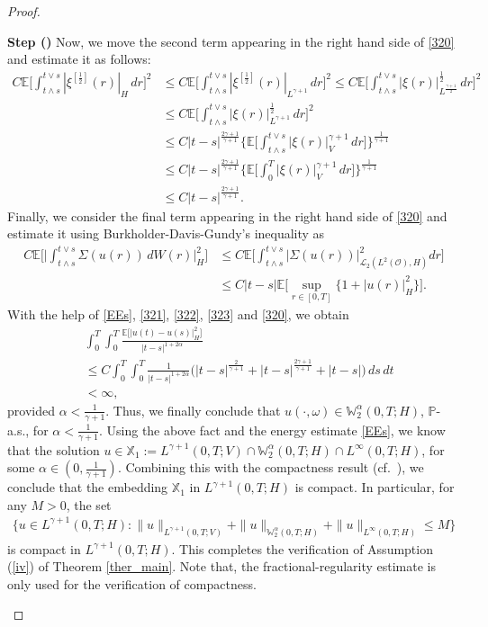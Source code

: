 \documentclass[english,a4paper,11pt]{amsart}
\theoremstyle{plain}
\theoremstyle{definition}
\theoremstyle{remark}
\numberwithin{equation}{section}
\newcounter{lil1}
\newenvironment{step}
{\begin{list} { \bf Step (\Roman{lil1})}
		{ \usecounter{lil1}
			\setlength{\leftmargin}{0.0cm}
			\setlength{\topsep}{0.2cm}
			\setlength{\itemsep}{0.0cm}
			\setlength{\parsep}{0.1cm}
			\setlength{\itemindent}{0.8cm}
			\setlength{\parskip}{0.0cm}}}
	{\end{list}}
\newcounter{lil33}
\newcounter{lil1q}
\newcommand{\PP}{{\mathbb{P}}}
\newcommand{\EE}{ \mathbb{E} }
\newcommand{\X}{\mathbb{X}}
\begin{document}
\begin{proof}
\begin{step}
{Now, we move the second term appearing in the right hand side of \eqref{320} and estimate it as follows: 
\begin{align}\label{322}\nonumber
	C\EE\bigg[\int_{t\wedge s}^{t\vee s} |\xi^{[\frac{1}{2}]}(r)|_H\, d r\bigg]^2& \leq C \EE\bigg[\int_{t\wedge s}^{t\vee s} |\xi^{[\frac{1}{2}]}(r)|_{L^{\gamma+1}}\,  dr\bigg]^2  
	\leq C \EE\bigg[\int_{t\wedge s}^{t\vee s} |\xi(r)|_{L^{\frac{\gamma+1}{2}}}^\frac{1}{2} \, dr\bigg]^2\\&\nonumber
		\leq C \EE\bigg[\int_{t\wedge s}^{t\vee s} |\xi(r)|_{L^{\gamma+1}}^\frac{1}{2}\,  dr\bigg]^2
	\\& \leq \nonumber
	C |t-s|^{\frac{2\gamma+1}{\gamma+1}}\bigg\{\EE\bigg[\int_{t\wedge s}^{t\vee s} |\xi(r)|_V^{\gamma+1}\,  d r\bigg] \bigg\}^\frac{1}{\gamma+1}
		\\&\nonumber \leq 
	C |t-s|^{\frac{2\gamma+1}{\gamma+1}}\bigg\{\EE\bigg[\int_0^T |\xi(r)|_V^{\gamma+1}\,  d r\bigg] \bigg\}^\frac{1}{\gamma+1} \\&\leq 
	C |t-s|^{\frac{2\gamma+1}{\gamma+1}}. 
\end{align}Finally, we consider the final term appearing in the right hand side of \eqref{320} and estimate it using Burkholder-Davis-Gundy's inequality as 
\begin{align}\label{323}\nonumber
	C\EE\bigg[\bigg|\int_{t\wedge s}^{t\vee s}\Sigma(u(r))\, dW(r)\bigg|_{H}^2\bigg] & \leq C \EE\bigg[\int_{t\wedge s}^{t\vee s} |\Sigma(u(r))|_{\mathcal{L}_2(L^2(\mathcal{O}), H)}^2dr  \bigg] 
	\\& \leq C |t-s| \EE\bigg[\sup_{r\in[0,T]}\big\{1+ |u(r)|_H^2\big\}\bigg].
\end{align}With the help of \eqref{EEs}, \eqref{321}, \eqref{322}, \eqref{323} and \eqref{320}, we obtain 
\begin{align*}
&\int_0^T \int_0^T \frac{\EE\big[|u(t)-u(s)|_H^2\big]}{|t-s|^{1+2\alpha}}	
\\& \nonumber \leq C\int_0^T \int_0^T \frac{1}{|t-s|^{1+2\alpha }} \Big(|t-s|^{\frac{2}{\gamma+1}}+|t-s|^{\frac{2\gamma+1}{\gamma+1}}+|t-s|  \Big)\, ds\, dt 
\\& <\infty,
\end{align*} provided $\alpha <\frac{1}{\gamma+1}$.
Thus, we finally conclude that $u(\cdot,\omega)\in \mathbb{W}^{\alpha}_2(0,T;H)$, $\PP$-a.s., for $\alpha <\frac{1}{\gamma+1}$.}
Using the above fact and the energy estimate \eqref{EEs}, we know that the solution $u\in \X_1:= L^{\gamma+1}(0,T;V)\cap \mathbb{W}^\alpha_2(0,T;H)\cap L^\infty(0,T;H)$, for some $\alpha\in (0,\frac{1}{\gamma+1})$. Combining this with the compactness result \cite[Theorem A.2]{FHEHKK} (cf.~\cite{Simon1986}), we conclude that the embedding $\X_1$ in $L^{\gamma+1}(0,T;H)$ is compact. In particular, for any $M>0$, the set 
\begin{align*}
		\Big\{u\in L^{\gamma+1}(0,T;H): \|u\|_{L^{\gamma+1}(0,T;V)}+\|u\|_{\mathbb{W}^\alpha_2(0,T;H)}+\|u\|_{L^\infty(0,T;H)}\leq M \Big\}
\end{align*} is compact in $L^{\gamma+1}(0,T;H)$. This completes the verification of Assumption (\ref{iv}) of Theorem \ref{ther_main}. {Note that, the fractional-regularity estimate is only used for the verification of compactness.}


\end{step}
\end{proof}
\end{document}
